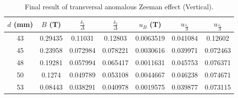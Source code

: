 \documentclass[a4paper,12pt]{article}
\begin{document}
    \begin{table}[H]
        \centering
        \caption{Side product before the final result, where $\delta_{1}$ is the average of 1 and 2 cells, $\delta_{2}$ is the average of 3 and 4 cells, and $\Delta$ is the average of 5 and 6 and 7 cells.Units are all square of pixel }
    \end{table}
    
    \begin{table}[H]
        \centering
        \caption{Final result of transversal anomalous Zeeman effect (Vertical).}
        \begin{tabular}{c|c|c|c|c|c|c}
            $d $ (mm)& $B $ (T)& $\frac{\delta_{1}}{\Delta}$ & $\frac{\delta_{2}}{\Delta}$& $u_{B} $ (T)& $u_{\frac{\delta_{1}}{\Delta}} $& $u_{\frac{\delta_{2}}{\Delta}} $ \\ \hline \hline
            43&0.29435&0.11031&0.12803&0.0063519&0.041084&0.12602  \\ \hline
            45&0.23958&0.072984&0.078221&0.0030616&0.039971&0.072463 \\ \hline
            48&0.19281&0.057994&0.065417&0.0011631&0.045753&0.076371  \\ \hline
            50&0.1274&0.049789&0.053108&0.0044667&0.046238&0.074671 \\ \hline        53&0.08443&0.038291&0.040978&0.0019575&0.039877&0.073115 \\ \hline
        \end{tabular}
        \label{tab:tra_ano_final}
    \end{table}
    
\end{document}
